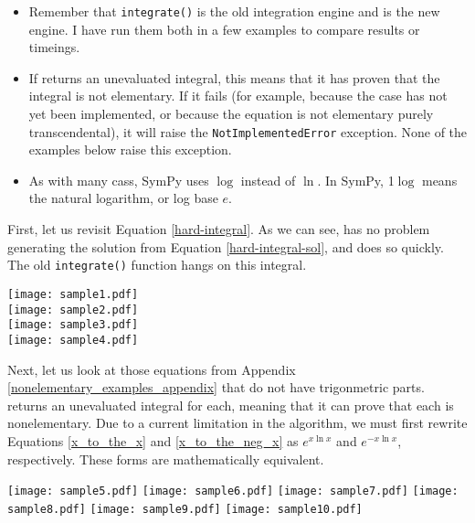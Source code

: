 \begin{itemize}
\item Remember that \texttt{integrate()} is the old \gls{integration}
engine and \rischintegrate{} is the new engine.  I have run them both in a
few examples to compare results or timeings.  

\item If \rischintegrate{} returns an unevaluated integral, this means
that it has proven that the integral is not \gls{elementary}.  If it
fails (for example, because the case has not yet been implemented, or
because the equation is not \gls{elementary} purely
\gls{transcendental}), it will raise the \texttt{NotImplementedError}
exception.  None of the examples below raise this exception.

\item As with many \glspl{cas}, SymPy uses $\log$ instead of $\ln$. 
In SymPy, 1$\log$ means the natural logarithm, or log base $e$.
\end{itemize}

First, let us revisit Equation \ref{hard-integral}.  As we can see,
\rischintegrate{} has no problem generating the solution from Equation
\ref{hard-integral-sol}, and does so quickly.  The old
\texttt{integrate()} function hangs on this integral.

\begin{flushleft}
\texttt{[image: sample1.pdf]}\\
\texttt{[image: sample2.pdf]}\\
\texttt{[image: sample3.pdf]}\\
\texttt{[image: sample4.pdf]}
\end{flushleft}

Next, let us look at those equations from Appendix
\ref{nonelementary_examples_appendix} that do not have
trigonmetric parts.  \rischintegrate{} returns an unevaluated integral for
each, meaning that it can prove that each is nonelementary.  Due to a
current limitation in the algorithm, we must first rewrite Equations
\ref{x_to_the_x} and \ref{x_to_the_neg_x} as $e^{x\ln{x}}$ and
$e^{-x\ln{x}}$, respectively.  These forms are mathematically equivalent.

\begin{flushleft}
\texttt{[image: sample5.pdf]}
\texttt{[image: sample6.pdf]}
\texttt{[image: sample7.pdf]}
\texttt{[image: sample8.pdf]}
\texttt{[image: sample9.pdf]}
\texttt{[image: sample10.pdf]}
\end{flushleft}

